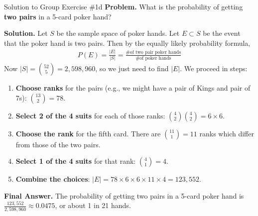 \documentclass[10pt]{beamer}
\begin{document}
\begin{frame}{Solution to Group Exercise \#1d}
\footnotesize 
 \colorbox{blue!30}{\textbf{Problem.}} What is the probability of getting \textbf{two pairs} in a 5-card poker hand?
\vfill 

 \colorbox{green!30}{\textbf{Solution.}} Let $S$ be the sample space of poker hands. 
Let $E \subset S$ be the event that the poker hand is two pairs. Then by the equally likely probability formula, 
\begin{align*}
P(E) = 	\frac{|E|}{|S|} = \frac{\text{\# of two pair poker hands}}{\text{\# of poker hands}}
\end{align*}
Now $|S|=\binom{52}{5} =  2,598,960$, so we just need to find $|E|$.  We proceed in steps:

\begin{enumerate} \footnotesize 
\item \textbf{Choose ranks} for the pairs (e.g., we might have a pair of Kings and pair of 7s):  $\binom{13}{2}=78$.
\item \textbf{Select 2 of the 4 suits} for each of those ranks:  $\binom{4}{2} \binom{4}{2}=6 \times 6$.
\item \textbf{Choose the rank} for the fifth card.  There are $\binom{11}{1}=11$ ranks which differ from those of the two pairs.
\item \textbf{Select 1 of the 4 suits} for that rank:  $\binom{4}{1}=4$.
\item \textbf{Combine the choices}:  $|E|=78 \times 6  \times 6 \times 11 \times 4 = 123,552$.
\end{enumerate}
\vspace{-.1cm}
\alert{\textbf{Final Answer.}} The probability of getting two pairs in a 5-card poker hand is $\frac{123,552}{2,598,960} \approx 0.0475$, or about 1 in 21 hands.
\end{frame}
\end{document}
